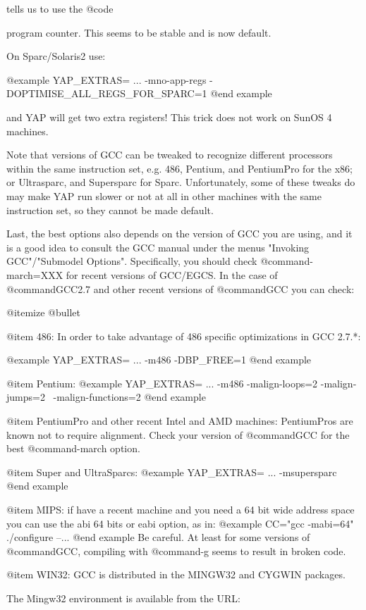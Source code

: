 tells us to use the @code{%
program counter. This seems to be stable and is now default.

On  Sparc/Solaris2 use:

@example
YAP_EXTRAS= ...   -mno-app-regs -DOPTIMISE_ALL_REGS_FOR_SPARC=1
@end example

and YAP will get two extra registers! This trick does not work on
SunOS 4 machines.

Note that versions of GCC can be tweaked to recognize different
processors within the same instruction set, e.g. 486, Pentium, and
PentiumPro for the x86; or Ultrasparc, and Supersparc for
Sparc. Unfortunately, some of these tweaks do may make YAP run slower or
not at all in other machines with the same instruction set, so they
cannot be made default.

Last, the best options also depends on the version of GCC you are using, and
it is a good idea to consult the GCC manual under the menus "Invoking
GCC"/"Submodel Options". Specifically, you should check
@command{-march=XXX} for recent versions of GCC/EGCS. In the case of
@command{GCC2.7} and other recent versions of @command{GCC} you can check:

@itemize @bullet

@item 486:
In order to take advantage of 486 specific optimizations in GCC 2.7.*:

@example
YAP_EXTRAS= ... -m486 -DBP_FREE=1
@end example

@item Pentium:
@example
YAP_EXTRAS= ... -m486 -malign-loops=2 -malign-jumps=2 \
                      -malign-functions=2
@end example

@item PentiumPro and other recent Intel and AMD machines:
PentiumPros are known not to require alignment. Check your version of
@command{GCC} for the best @command{-march} option.

@item Super and UltraSparcs:
@example
YAP_EXTRAS= ... -msupersparc
@end example

@item MIPS: if have a recent machine and you need a 64 bit wide address
space you can use the abi 64 bits or eabi option, as in:
@example
CC="gcc -mabi=64" ./configure --...
@end example
Be careful. At least for some versions of @command{GCC}, compiling with
@command{-g} seems to result in broken code.

@item WIN32: GCC is distributed in the MINGW32 and CYGWIN packages.

The Mingw32 environment is available from the URL:

}

